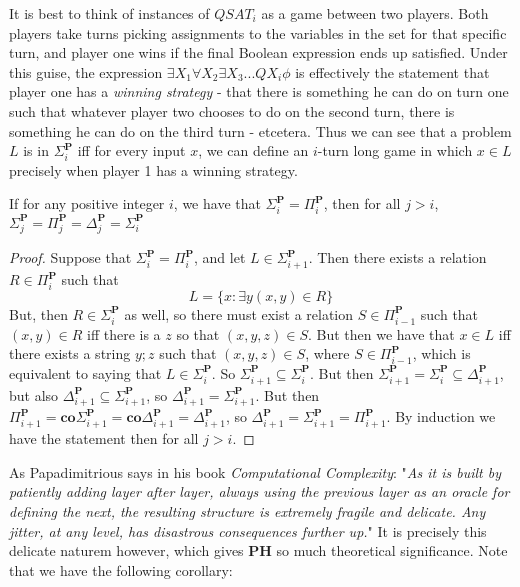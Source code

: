 It is best to think of instances of $QSAT_i$ as a game between two players. Both players take turns picking assignments to the variables in the set for that specific turn, and player one wins if the final Boolean expression ends up satisfied. Under this guise, the expression $\exists X_1 \forall X_2 \exists X_3... QX_i \phi$ is effectively the statement that player one has a \textit{winning strategy} - that there is something he can do on turn one such that whatever player two chooses to do on the second turn, there is something he can do on the third turn - etcetera. Thus we can see that a problem $L$ is in $\Sigma_i^{\textbf{P}}$ iff for every input $x$, we can define an $i$-turn long game in which $x \in L$ precisely when player 1 has a winning strategy. 
\begin{theorem}
    If for any positive integer $i$, we have that $\Sigma_i^{\textbf{P}} = \Pi_i^{\textbf{P}}$, then for all $j > i$, $\Sigma_j^{\textbf{P}} = \Pi_j^{\textbf{P}} = \Delta_j^{\textbf{P}} = \Sigma_i^{\textbf{P}}$
\end{theorem}
\begin{proof}
    Suppose that $\Sigma_i^{\textbf{P}} = \Pi_i^{\textbf{P}}$, and let $L \in \Sigma_{i+1}^{\textbf{P}}$. Then there exists a relation $R \in \Pi_i^{\textbf{P}}$ such that 
    \[L = \{x: \exists y (x,y) \in R\} \]
    But, then $R \in \Sigma_i^{\textbf{P}}$ as well, so there must exist a relation $S \in \Pi_{i-1}^{\textbf{P}}$ such that $(x,y) \in R$ iff there is a $z$ so that $(x,y,z) \in S$. But then we have that $x \in L$ iff there exists a string $y;z$ such that $(x,y,z) \in S$, where $S \in \Pi_{i-1}^{\textbf{P}}$, which is equivalent to saying that $L \in \Sigma_i^{\textbf{P}}$. So $\Sigma_{i+1}^{\textbf{P}} \subseteq \Sigma_i^{\textbf{P}}$.
    But then $\Sigma_{i+1}^{\textbf{P}} = \Sigma_i^{\textbf{P}} \subseteq \Delta_{i+1}^{\textbf{P}}$, but also $\Delta_{i+1}^{\textbf{P}} \subseteq \Sigma_{i+1}^{\textbf{P}}$, so $\Delta_{i+1}^{\textbf{P}} = \Sigma_{i+1}^{\textbf{P}}$. But then $\Pi_{i+1}^{\textbf{P}} = \textbf{co}\Sigma_{i+1}^{\textbf{P}} = \textbf{co}\Delta_{i+1}^{\textbf{P}} = \Delta_{i+1}^{\textbf{P}}$, so $\Delta_{i+1}^{\textbf{P}} = \Sigma_{i+1}^{\textbf{P}} = \Pi_{i+1}^{\textbf{P}}$. By induction we have the statement then for all $j > i$.
\end{proof}
As Papadimitrious says in his book \textit{Computational Complexity}: "\textit{As it is built by patiently adding layer after layer, always using the previous layer as an oracle for defining the next, the resulting structure is extremely fragile and delicate. Any jitter, at any level, has disastrous consequences further up.}" It is precisely this delicate naturem however, which gives $\textbf{PH}$ so much theoretical significance. Note that we have the following corollary:
